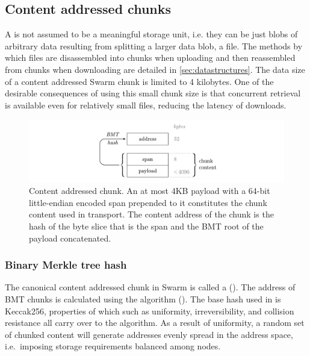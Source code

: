 \subsection{Content addressed  chunks\statusgreen}\label{sec:content-addressed-chunks}

A  is not assumed to be a meaningful storage unit, i.e. they can be just blobs of arbitrary data resulting from splitting a larger data blob, a file. The methods by which files are disassembled into chunks when uploading and then reassembled from chunks when downloading are detailed in \ref{sec:datastructures}. The data size of a content addressed Swarm chunk is limited to 4 kilobytes. One of the desirable consequences of using this small chunk size is that concurrent retrieval is available even for relatively small files, reducing the latency of downloads. 

\begin{figure}[htbp]
   \centering
   \includegraphics[width=\textwidth]{fig/content-addressed-chunk-3.pdf}
   \caption[Content addressed chunk\statusgreen]{Content addressed chunk. An at most 4KB payload with a 64-bit little-endian encoded span prepended to it constitutes the chunk content used in transport. The content address of the chunk is the hash of the byte slice that is the span and the BMT root of the payload concatenated.}
   \label{fig:content-addressed-chunk}
\end{figure}

\subsubsection{Binary Merkle tree hash}

The canonical content addressed chunk in Swarm is called a  ().
The address of BMT chunks is calculated using the  algorithm (). The base hash used in  is Keccak256, properties of which such as uniformity, irreversibility, and collision resistance all carry over to the  algorithm. As a result of uniformity, a random set of chunked content will generate addresses evenly spread in the address space, i.e.\ imposing storage requirements balanced among nodes.


